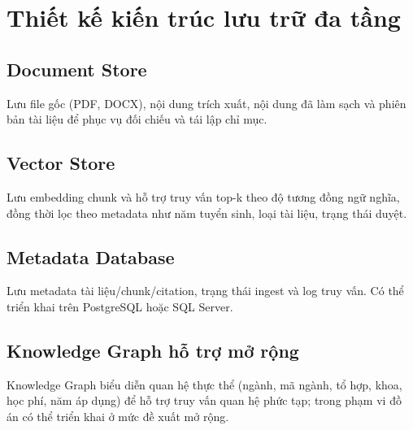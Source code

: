 ﻿\section{Thiết kế kiến trúc lưu trữ đa tầng}

\subsection{Document Store}

Lưu file gốc (PDF, DOCX), nội dung trích xuất, nội dung đã làm sạch và phiên bản tài liệu để phục vụ đối chiếu và tái lập chỉ mục.

\subsection{Vector Store}

Lưu embedding chunk và hỗ trợ truy vấn top-k theo độ tương đồng ngữ nghĩa, đồng thời lọc theo metadata như năm tuyển sinh, loại tài liệu, trạng thái duyệt.

\subsection{Metadata Database}

Lưu metadata tài liệu/chunk/citation, trạng thái ingest và log truy vấn. Có thể triển khai trên PostgreSQL hoặc SQL Server.

\subsection{Knowledge Graph hỗ trợ mở rộng}

Knowledge Graph biểu diễn quan hệ thực thể (ngành, mã ngành, tổ hợp, khoa, học phí, năm áp dụng) để hỗ trợ truy vấn quan hệ phức tạp; trong phạm vi đồ án có thể triển khai ở mức đề xuất mở rộng.
